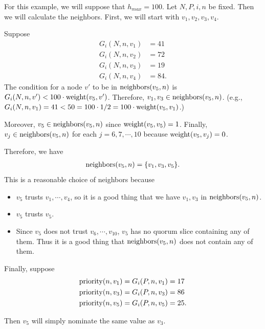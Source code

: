 \begin{exmp}
    For this example, we will suppose that $h_{max} = 100$.
    Let $N, P, i, n$ be fixed.
    Then we will calculate the neighbors.
    First, we will start with $v_1, v_2, v_3, v_4$.

    Suppose
    \begin{align*}
        G_i(N, n, v_1) &= 41 \\
        G_i(N, n, v_2) &= 72 \\
        G_i(N, n, v_3) &= 19 \\
        G_i(N, n, v_4) &= 84.
    \end{align*}
    The condition for a node $v'$ to be in $\operatorname{neighbors}(v_5, n)$ is $G_i(N, n, v') < 100 \cdot \operatorname{weight}(v_5, v')$.
    Therefore, $v_1, v_3 \in \operatorname{neighbors}(v_5, n)$.
    (e.g., $G_i(N, n, v_1) = 41 < 50 = 100 \cdot 1/2 = 100 \cdot \operatorname{weight}(v_5, v_1)$.)

    Moreover, $v_5 \in \operatorname{neighbors}(v_5, n)$ since $\operatorname{weight}(v_5, v_5) = 1$.
    Finally, $v_j \in \operatorname{neighbors}(v_5, n)$ for each $j = 6, 7, \cdots, 10$ because $\operatorname{weight}(v_5, v_j) = 0$.

    Therefore, we have
    \begin{align*}
        \operatorname{neighbors}(v_5, n) = \{ v_1, v_3, v_5 \}.
    \end{align*}
    This is a reasonable choice of neighbors because
    \begin{itemize}
        \item
            $v_5$ trusts $v_1, \cdots, v_4$, so it is a good thing that we have $v_1, v_3$ in $\operatorname{neighbors}(v_5, n)$.
        \item
            $v_5$ trusts $v_5$.
        \item
            Since $v_5$ does not trust $v_6, \cdots, v_{10}$, $v_5$ has no quorum slice containing any of them.
            Thus it is a good thing that $\operatorname{neighbors}(v_5, n)$ does not contain any of them.
    \end{itemize}

    Finally, suppose
    \begin{align*}
        \operatorname{priority}(n, v_1) &= G_i(P, n, v_1) = 17 \\
        \operatorname{priority}(n, v_3) &= G_i(P, n, v_3) = 86 \\
        \operatorname{priority}(n, v_5) &= G_i(P, n, v_5) = 25.
    \end{align*}

    Then $v_5$ will simply nominate the same value as $v_3$.
\end{exmp}

